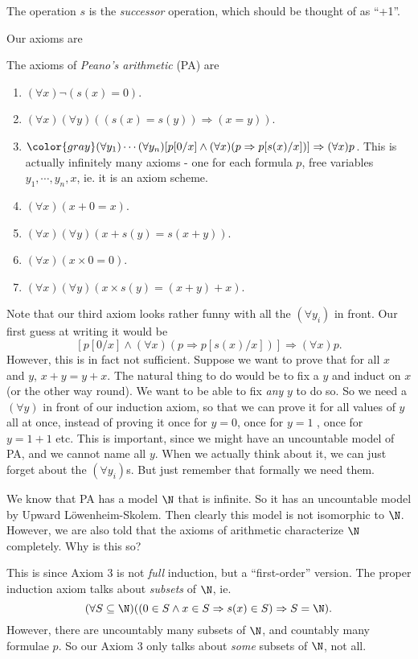 \documentclass[a4paper]{article}
\begin{document}
The operation $s$ is the \emph{successor} operation, which should be thought of as ``+1''.

Our axioms are
\begin{defi}
  The axioms of \emph{Peano's arithmetic} (PA) are
  \begin{enumerate}
    \item $(\forall x)\neg(s(x) = 0)$.
    \item $(\forall x)(\forall y)((s(x) = s(y)) \Rightarrow (x = y))$.
    \item ${\color{gray}(\forall y_1)\cdots (\forall y_n)}[p[0/x] \wedge (\forall x)(p \Rightarrow p[s(x)/x])]\Rightarrow (\forall x)p$. This is actually infinitely many axioms - one for each formula $p$, free variables $y_1, \cdots, y_n, x$, ie. it is an axiom scheme.
    \item $(\forall x)(x + 0 = x)$.
    \item $(\forall x)(\forall y)(x + s(y) = s(x + y))$.
    \item $(\forall x)(x \times 0 = 0)$.
    \item $(\forall x)(\forall y)(x\times s(y) = (x + y) + x)$.
  \end{enumerate}
  Note that our third axiom looks rather funny with all the $(\forall y_i)$ in front. Our first guess at writing it would be
  \[
    [p[0/x] \wedge (\forall x)(p\Rightarrow p[s(x)/x])] \Rightarrow (\forall x)p.
  \]
  However, this is in fact not sufficient. Suppose we want to prove that for all $x$ and $y$, $x + y = y + x$. The natural thing to do would be to fix a $y$ and induct on $x$ (or the other way round). We want to be able to fix \emph{any} $y$ to do so. So we need a $(\forall y)$ in front of our induction axiom, so that we can prove it for all values of $y$ all at once, instead of proving it once for $y = 0$, once for $y = 1$ , once for $y = 1 + 1$ etc. This is important, since we might have an uncountable model of PA, and we cannot name all $y$. When we actually think about it, we can just forget about the $(\forall y_i)$s. But just remember that formally we need them.
\end{defi}
We know that PA has a model $\N$ that is infinite. So it has an uncountable model by Upward L\"owenheim-Skolem. Then clearly this model is not isomorphic to $\N$. However, we are also told that the axioms of arithmetic characterize $\N$ completely. Why is this so?

This is since Axiom 3 is not \emph{full} induction, but a ``first-order'' version. The proper induction axiom talks about \emph{subsets} of $\N$, ie.
\[
  (\forall S\subseteq \N )((0 \in S \wedge x\in S \Rightarrow  s(x)\in S)\Rightarrow S=\N).
\]
However, there are uncountably many subsets of $\N$, and countably many formulae $p$. So our Axiom 3 only talks about \emph{some} subsets of $\N$, not all.
\end{document}
